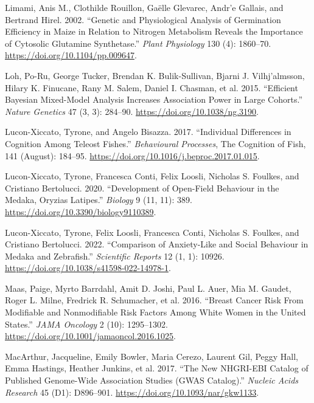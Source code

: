 \documentclass[
]{book}
\newlength{\cslhangindent}
\newlength{\cslentryspacingunit} %
\newenvironment{CSLReferences}[2] %
 {%
  \setlength{\parindent}{0pt}
  \ifodd #1
  \let\oldpar\par
  \def\par{\hangindent=\cslhangindent\oldpar}
  \fi
  \setlength{\parskip}{#2\cslentryspacingunit}
 }%
 {}
\begin{document}
\begin{CSLReferences}{1}{0}
\leavevmode{}%
Limami, Anis M., Clothilde Rouillon, Gaëlle Glevarec, Andr'e Gallais, and Bertrand Hirel. 2002. {``Genetic and {Physiological Analysis} of {Germination Efficiency} in {Maize} in {Relation} to {Nitrogen Metabolism Reveals} the {Importance} of {Cytosolic Glutamine Synthetase}.''} \emph{Plant Physiology} 130 (4): 1860--70. \url{https://doi.org/10.1104/pp.009647}.

\leavevmode{}%
Loh, Po-Ru, George Tucker, Brendan K. Bulik-Sullivan, Bjarni J. Vilhj'almsson, Hilary K. Finucane, Rany M. Salem, Daniel I. Chasman, et al. 2015. {``Efficient {Bayesian} Mixed-Model Analysis Increases Association Power in Large Cohorts.''} \emph{Nature Genetics} 47 (3, 3): 284--90. \url{https://doi.org/10.1038/ng.3190}.

\leavevmode{}%
Lucon-Xiccato, Tyrone, and Angelo Bisazza. 2017. {``Individual Differences in Cognition Among Teleost Fishes.''} \emph{Behavioural Processes}, The {Cognition} of {Fish}, 141 (August): 184--95. \url{https://doi.org/10.1016/j.beproc.2017.01.015}.

\leavevmode{}%
Lucon-Xiccato, Tyrone, Francesca Conti, Felix Loosli, Nicholas S. Foulkes, and Cristiano Bertolucci. 2020. {``Development of {Open-Field Behaviour} in the {Medaka}, {Oryzias} Latipes.''} \emph{Biology} 9 (11, 11): 389. \url{https://doi.org/10.3390/biology9110389}.

\leavevmode{}%
Lucon-Xiccato, Tyrone, Felix Loosli, Francesca Conti, Nicholas S. Foulkes, and Cristiano Bertolucci. 2022. {``Comparison of Anxiety-Like and Social Behaviour in Medaka and Zebrafish.''} \emph{Scientific Reports} 12 (1, 1): 10926. \url{https://doi.org/10.1038/s41598-022-14978-1}.

\leavevmode{}%
Maas, Paige, Myrto Barrdahl, Amit D. Joshi, Paul L. Auer, Mia M. Gaudet, Roger L. Milne, Fredrick R. Schumacher, et al. 2016. {``Breast {Cancer Risk From Modifiable} and {Nonmodifiable Risk Factors Among White Women} in the {United States}.''} \emph{JAMA Oncology} 2 (10): 1295--1302. \url{https://doi.org/10.1001/jamaoncol.2016.1025}.

\leavevmode{}%
MacArthur, Jacqueline, Emily Bowler, Maria Cerezo, Laurent Gil, Peggy Hall, Emma Hastings, Heather Junkins, et al. 2017. {``The New {NHGRI-EBI Catalog} of Published Genome-Wide Association Studies ({GWAS Catalog}).''} \emph{Nucleic Acids Research} 45 (D1): D896--901. \url{https://doi.org/10.1093/nar/gkw1133}.


\end{CSLReferences}
\end{document}
